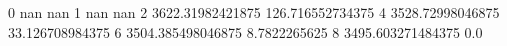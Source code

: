 0 nan nan
1 nan nan
2 3622.31982421875 126.716552734375
4 3528.72998046875 33.126708984375
6 3504.385498046875 8.7822265625
8 3495.603271484375 0.0
